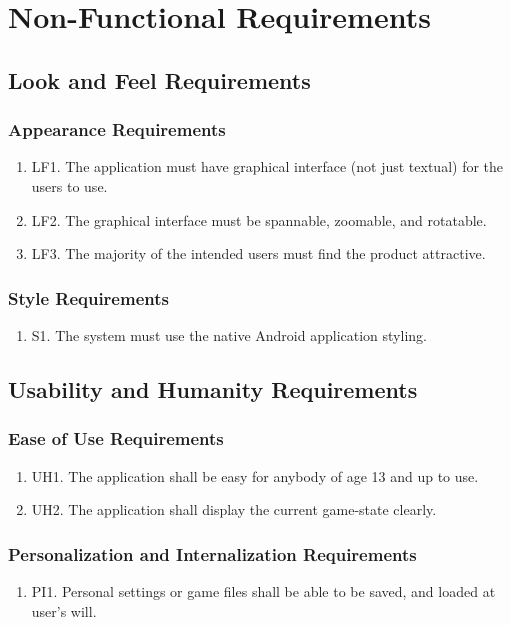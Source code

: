 \documentclass[]{article}
\begin{document}
\section{Non-Functional Requirements}
\subsection{Look and Feel Requirements}
\subsubsection{Appearance Requirements}
\begin{enumerate}
\item LF1. The application must have graphical interface (not just textual) for the users to use.
\item LF2. The graphical interface must be spannable, zoomable, and rotatable.
\item LF3. The majority of the intended users must find the product attractive. 
\end{enumerate}

\subsubsection{Style Requirements}
\begin{enumerate}
	\item S1. The system must use the native Android application styling.
\end{enumerate}

\subsection{Usability and Humanity Requirements}
\subsubsection{Ease of Use Requirements}
\begin{enumerate}
	\item UH1. The application shall be easy for anybody of age 13 and up to use.
	\item UH2. The application shall display the current game-state clearly.
\end{enumerate}

\subsubsection{Personalization and Internalization Requirements}
\begin{enumerate}
 \item PI1. Personal settings or game files shall be able to be saved, and loaded at user's will.
\end{enumerate}
\end{document}

